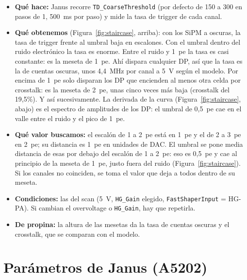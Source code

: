 \documentclass[11pt,a4paper]{article}
\begin{document}
\begin{itemize}
\item {\bf Qué hace:} Janus recorre \texttt{TD\_CoarseThreshold} (por defecto
  de 150 a 300 en pasos de 1, 500~ms por paso) y mide la tasa de trigger de
  cada canal. 
\item {\bf Qué obtenemos} (Figura~\ref{fig:staircase}, arriba): con los
  SiPM a oscuras, la tasa de trigger frente al umbral baja en escalones.
  Con el umbral dentro del ruido electrónico la tasa es enorme. Entre el
  ruido y 1~pe la tasa es casi constante: es la meseta de 1~pe. Ahí dispara
  cualquier DP, así que la tasa es la de cuentas oscuras, unos 4,4~MHz por
  canal a 5~V según el modelo. Por encima de 1~pe solo disparan los DP que
  encienden al menos otra celda por crosstalk: es la meseta de 2~pe, unas
  cinco veces más baja (crosstalk del 19,5\%). Y así sucesivamente. La
  derivada de la curva (Figura~\ref{fig:staircase}, abajo) es el espectro de
  amplitudes de los DP: el umbral de 0,5~pe cae en el valle entre el ruido y
  el pico de 1~pe.
\item {\bf Qué valor buscamos:} el escalón de 1 a 2~pe está en 1~pe y el
  de 2 a 3~pe en 2~pe; su distancia es 1~pe en unidades de DAC. El umbral
  se pone media distancia de esas por debajo del escalón de 1 a 2~pe: eso
  es 0,5~pe y cae al principio de la meseta de 1~pe, justo fuera del ruido
  (Figura~\ref{fig:staircase}). Si los canales no coinciden, se toma el valor que deja a todos
  dentro de su meseta.
\item {\bf Condiciones:} las del scan (5~V, \texttt{HG\_Gain} elegido,
  \texttt{FastShaperInput} = HG-PA). Si cambian el overvoltage o
  \texttt{HG\_Gain}, hay que repetirla.
\item {\bf De propina:} la altura de las mesetas da la tasa de cuentas
  oscuras y el crosstalk, que se comparan con el modelo.
\end{itemize}

\section{Parámetros de Janus (A5202)}
\label{sec:janus}
\end{document}
